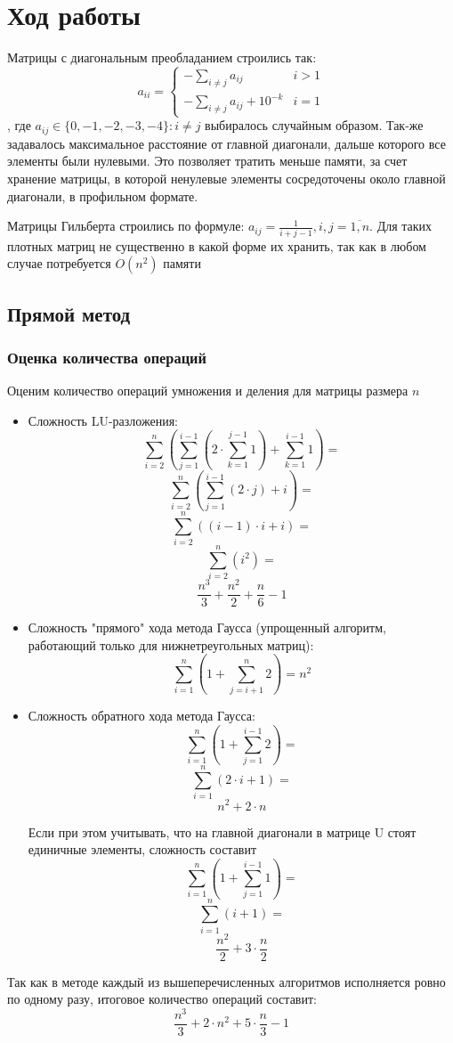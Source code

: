 \documentclass[english]{article}
\begin{document}
\section{Ход работы}
Матрицы с диагональным преобладанием строились так:
\[ a_{ii} = \begin{cases}
  -\sum\limits_{i \neq j} a_{ij} & i > 1 \\
  -\sum\limits_{i \neq j} a_{ij} + 10^{-k} & i = 1
\end{cases} \]
, где \(a_{ij} \in \{0, -1, -2, -3, -4\}: i \neq j \) выбиралось
случайным образом. Так-же задавалось максимальное расстояние от главной
диагонали, дальше которого все элементы были нулевыми. Это позволяет
тратить меньше памяти, за счет хранение матрицы, в которой ненулевые
элементы сосредоточены около главной диагонали, в профильном
формате.

Матрицы Гильберта строились по формуле: \(a_{ij} = \frac{1}{i + j -
  1}, i,j = \overline{1, n}\). Для таких плотных матриц не существенно
в какой форме их хранить, так как в любом случае потребуется
\(O(n^2)\) памяти

\subsection{Прямой метод}
\subsubsection{Оценка количества операций}
Оценим количество операций умножения и деления для матрицы размера \(n\)
\begin{itemize}
\item Сложность LU-разложения:
\[ \sum_{i=2}^{n} (\sum_{j=1}^{i - 1} (2 \cdot \sum_{k=1}^{j-1} 1) + \sum_{k=1}^{i-1} 1) =\]
\[ \sum_{i=2}^{n} (\sum_{j=1}^{i - 1} (2 \cdot j) + i) =\]
\[ \sum_{i=2}^{n} ((i - 1) \cdot i + i) =\]
\[ \sum_{i=2}^{n} (i^2) =\]
\[ \frac{n^3}{3} + \frac{n^2}{2} + \frac{n}{6} - 1\]
\item Сложность "прямого" хода метода Гаусса (упрощенный алгоритм, работающий только для нижнетреугольных матриц):
\[ \sum_{i=1}^{n} (1 + \sum_{j=i+1}^{n} 2) = n^2\]
\item Сложность обратного хода метода Гаусса:
\[ \sum_{i=1}^{n} (1 + \sum_{j=1}^{i-1} 2) =\]
\[ \sum_{i=1}^{n} (2 \cdot i + 1) =\]
\[ n^2 + 2 \cdot n\]

Если при этом учитывать, что на главной диагонали в матрице U стоят единичные элементы, сложность составит
\[ \sum_{i=1}^{n} (1 + \sum_{j=1}^{i-1} 1) =\]
\[ \sum_{i=1}^{n} (i + 1) =\]
\[ \frac{n^2}{2} + 3 \cdot \frac{n}{2}\]
\end{itemize}
Так как в методе каждый из вышеперечисленных алгоритмов исполняется ровно по одному разу, итоговое количество операций составит:
\[ \frac{n^3}{3} + 2 \cdot n^2 + 5 \cdot \frac{n}{3} - 1\]
\end{document}
